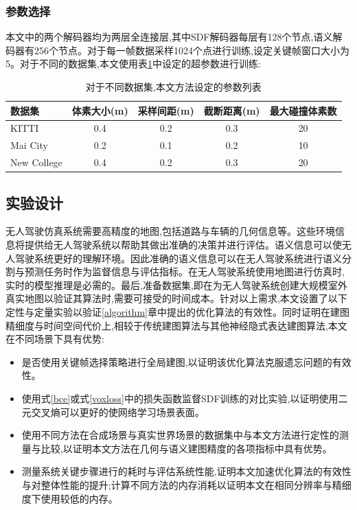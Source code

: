 \subsubsection{参数选择}
本文中的两个解码器均为两层全连接层,其中SDF解码器每层有128个节点,语义解码器有256个节点。对于每一帧数据采样1024个点进行训练,设定关键帧窗口大小为5。对于不同的数据集,本文使用表\ref{parameters}中设定的超参数进行训练:
\begin{table}[htbp]
    \centering
    \caption{对于不同数据集,本文方法设定的参数列表}\label{parameters}
    \begin{tabular}[htbp]{llcccc}
        \toprule
        \multicolumn{2}{l}{数据集} & 体素大小(m) & 采样间距(m) & 截断距离(m) &最大碰撞体素数 \\
        \midrule
        \multicolumn{2}{l}{KITTI} & 0.4 & 0.2 &0.3 &20\\
        \multicolumn{2}{l}{Mai City} & 0.2 &0.1&0.2&10\\
        \multicolumn{2}{l}{New College} & 0.4 &0.2&0.3&20\\
        \bottomrule
    \end{tabular}
\end{table}
\subsection{实验设计}

无人驾驶仿真系统需要高精度的地图,包括道路与车辆的几何信息等。这些环境信息将提供给无人驾驶系统以帮助其做出准确的决策并进行评估。语义信息可以使无人驾驶系统更好的理解环境。因此准确的语义信息可以在无人驾驶系统进行语义分割与预测任务时作为监督信息与评估指标。在无人驾驶系统使用地图进行仿真时,实时的模型推理是必需的。最后,准备数据集,即在为无人驾驶系统创建大规模室外真实地图以验证其算法时,需要可接受的时间成本。针对以上需求,本文设置了以下定性与定量实验以验证\ref{algorithm}章中提出的优化算法的有效性。同时证明在建图精细度与时间空间代价上,相较于传统建图算法与其他神经隐式表达建图算法,本文在不同场景下具有优势:
\begin{itemize}
	\item 是否使用关键帧选择策略进行全局建图,以证明该优化算法克服遗忘问题的有效性。
	\item 使用式\ref{bce}或式\ref{voxloss}中的损失函数监督SDF训练的对比实验,以证明使用二元交叉熵可以更好的使网络学习场景表面。
	\item 使用不同方法在合成场景与真实世界场景的数据集中与本文方法进行定性的测量与比较,以证明本文方法在几何与语义建图精度的各项指标中具有优势。
	\item 测量系统关键步骤进行的耗时与评估系统性能,证明本文加速优化算法的有效性与对整体性能的提升;计算不同方法的内存消耗以证明本文在相同分辨率与精细度下使用较低的内存。
\end{itemize}
